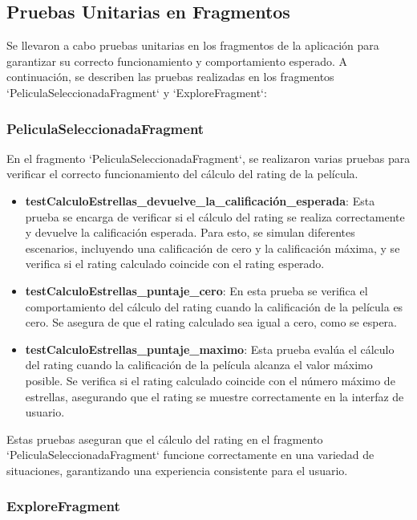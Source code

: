 \documentclass{article}
\begin{document}
\subsection{Pruebas Unitarias en Fragmentos}

Se llevaron a cabo pruebas unitarias en los fragmentos de la aplicación para garantizar su correcto funcionamiento y comportamiento esperado. A continuación, se describen las pruebas realizadas en los fragmentos `PeliculaSeleccionadaFragment` y `ExploreFragment`:

\subsubsection{PeliculaSeleccionadaFragment}

En el fragmento `PeliculaSeleccionadaFragment`, se realizaron varias pruebas para verificar el correcto funcionamiento del cálculo del rating de la película.

\begin{itemize}
    \item \textbf{testCalculoEstrellas\_devuelve\_la\_calificación\_esperada}: Esta prueba se encarga de verificar si el cálculo del rating se realiza correctamente y devuelve la calificación esperada. Para esto, se simulan diferentes escenarios, incluyendo una calificación de cero y la calificación máxima, y se verifica si el rating calculado coincide con el rating esperado.
    
    \item \textbf{testCalculoEstrellas\_puntaje\_cero}: En esta prueba se verifica el comportamiento del cálculo del rating cuando la calificación de la película es cero. Se asegura de que el rating calculado sea igual a cero, como se espera.
    
    \item \textbf{testCalculoEstrellas\_puntaje\_maximo}: Esta prueba evalúa el cálculo del rating cuando la calificación de la película alcanza el valor máximo posible. Se verifica si el rating calculado coincide con el número máximo de estrellas, asegurando que el rating se muestre correctamente en la interfaz de usuario.
\end{itemize}

Estas pruebas aseguran que el cálculo del rating en el fragmento `PeliculaSeleccionadaFragment` funcione correctamente en una variedad de situaciones, garantizando una experiencia consistente para el usuario.

\subsubsection{ExploreFragment}
\end{document}
